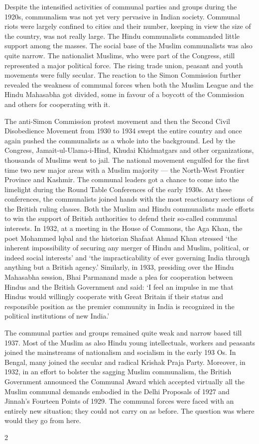 \begin{multicols}{2}
Despite the intensified activities of communal parties and groups during the 1920s, communalism was not yet very pervasive in Indian society. Communal riots were largely confined to cities and their number, keeping in view the size of the country, was not really large. The Hindu communalists commanded little support among the masses. The social base of the Muslim communalists was also quite narrow. The nationalist Muslims, who were part of the Congress, still represented a major political force. The rising trade union, peasant and youth movements were fully secular. The reaction to the Simon Commission further revealed the weakness of communal forces when both the Muslim League and the Hindu Mahasabha got divided, some in favour of a boycott of the Commission and others for cooperating with it. 

The anti-Simon Commission protest movement and then the Second Civil Disobedience Movement from 1930 to 1934 swept the entire country and once again pushed the communalists as a whole into the background. Led by the Congress, Jamait-ul-Ulama-i-Hind, Khudai Khidmatgars and other organizations, thousands of Muslims went to jail. The national movement engulfed for the first time two new major areas with a Muslim majority --- the North-West Frontier Province and Kashmir. The communal leaders got a chance to come into the limelight during the Round Table Conferences of the early 1930s. At these conferences, the communalists joined hands with the most reactionary sections of the British ruling classes. Both the Muslim and Hindu communalists made efforts to win the support of British authorities to defend their so-called communal interests. In 1932, at a meeting in the House of Commons, the Aga Khan, the poet Mohammed lqbal and the historian Shafaat Ahmad Khan stressed `the inherent impossibility of securing any merger of Hindu and Muslim, political, or indeed social interests' and `the impracticability of ever governing India through anything but a British agency.' Similarly, in 1933, presiding over the Hindu Mahasabha session, Bhai Parmanand made a plea for cooperation between Hindus and the British Government and said: `I feel an impulse in me that Hindus would willingly cooperate with Great Britain if their status and responsible position as the premier community in India is recognized in the political institutions of new India.' 

The communal parties and groups remained quite weak and narrow based till 1937. Most of the Muslim as also Hindu young intellectuals, workers and peasants joined the mainstreams of nationalism and socialism in the early 193 Os. In Bengal, many joined the secular and radical Krishak Praja Party. Moreover, in 1932, in an effort to bolster the sagging Muslim communalism, the British Government announced the Communal Award which accepted virtually all the Muslim communal demands embodied in the Delhi Proposals of 1927 and Jinnah's Fourteen Points of 1929. The communal forces were faced with an entirely new situation; they could not carry on as before. The question was where would they go from here. \end{multicols}{2}
